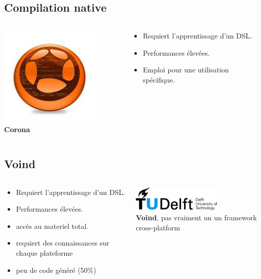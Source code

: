 \documentclass{beamer}
\begin{document}
\subsection{Compilation native}
\begin{frame}
\begin{columns}[c]
  \begin{column}{0.5\textwidth}
    \includegraphics[scale=0.7]{corona}
\textbf{Corona}
  \end{column}
  \begin{column}{0.5\textwidth}
    \begin{itemize}
\item Requiert l'apprentissage d'un DSL.
      \item Performances élevées.
\item Emploi pour une utilisation  spécifique.
    \end{itemize}
  \end{column}
\end{columns}
\end{frame}

\subsection{Voind}
\begin{frame}
\begin{columns}[c]
  \begin{column}{0.5\textwidth}
    \begin{itemize}
      \item Requiert l'apprentissage d'un DSL.
	\item Performances élevées.
	\item accès au materiel total.
\item requiert des connaissances sur chaque plateforme
\item peu de code généré (50\%)
    \end{itemize}
  \end{column}
  \begin{column}{0.5\textwidth}
    \begin{center}
      \includegraphics[scale=0.4]{voind} \\
	\textbf{Voind}, pas vraiment un un framework cross-platform
    \end{center}
  \end{column}
\end{columns}
\end{frame}
\end{document}
